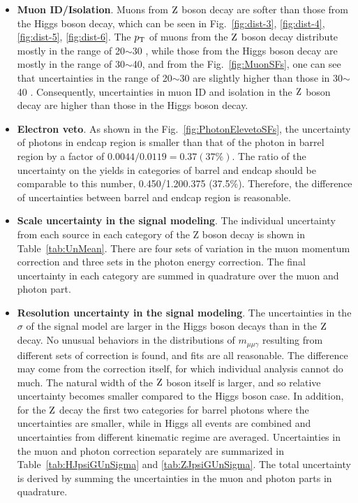  \begin{itemize}
	\item \textbf{Muon ID/Isolation}. Muons from $\mathrm{Z}$ boson decay are softer than those from the Higgs boson decay, which can be seen in Fig.~\ref{fig:dist-3}, \ref{fig:dist-4}, \ref{fig:dist-5}, \ref{fig:dist-6}. The $p_{\mathrm{T}}$ of muons from the $\mathrm{Z}$ boson decay distribute mostly in the range of 20$\sim$30 \GeV, while those from the Higgs boson decay are mostly in the range of 30$\sim$40\GeV, and from the Fig.~\ref{fig:MuonSFs}, one can see that uncertainties in the range of 20$\sim$30 \GeV are slightly higher than those in 30$\sim$40 \GeV. Consequently, uncertainties in muon ID and isolation in the $\mathrm{Z}$ boson decay are higher than those in the Higgs boson decay.
	\item \textbf{Electron veto}.  As shown in the Fig.~\ref{fig:PhotonElevetoSFs}, the uncertainty of photons in endcap region is smaller than that of the photon in barrel region by a factor of $0.0044/0.0119=0.37 (37\%)$. The ratio of the uncertainty on the yields in categories of barrel and endcap should be comparable to this number, 0.450/1.200.375 (37.5$\%$). Therefore, the difference of uncertainties between barrel and endcap region is reasonable.
	\item \textbf{Scale uncertainty in the signal modeling}. The individual uncertainty from each source in each category of the Z boson decay is shown in Table~\ref{tab:UnMean}. There are four sets of variation in the muon momentum correction and three sets in the photon energy correction. The final uncertainty in each category are summed in quadrature over the muon and photon part. 
	\item \textbf{Resolution uncertainty in the signal modeling}. The uncertainties in the $\sigma$ of the signal model are larger in the Higgs boson decays than in the $\mathrm{Z}$ decay. No unusual behaviors in the distributions of $m_{\mu\mu\gamma}$ resulting from different sets of correction is found, and fits are all reasonable. The difference may come from the correction itself, for which individual analysis cannot do much. The natural width of the $\mathrm{Z}$ boson itself is larger, and so relative uncertainty becomes smaller compared to the Higgs boson case. In addition, for the $\mathrm{Z}$ decay the first two categories for barrel photons where the uncertainties are smaller, while in Higgs all events are combined and uncertainties from different kinematic regime are averaged. Uncertainties in the muon and photon correction separately are summarized in Table~\ref{tab:HJpsiGUnSigma} and \ref{tab:ZJpsiGUnSigma}. The total uncertainty is derived by summing the uncertainties in the muon and photon parts in quadrature.
	\end{itemize}
	
